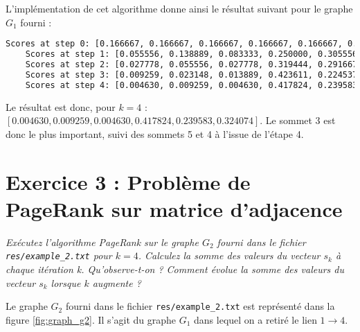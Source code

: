 L'implémentation de cet algorithme donne ainsi le résultat suivant pour le graphe $G_1$ fourni :

\begin{minipage}{\dimexpr\linewidth-20pt}
\begin{lstlisting}[language=bash, caption={Résultat de l'algorithme PageRank sur le graphe $G_1$ fourni, pour $k = 4$.}]
    Scores at step 0: [0.166667, 0.166667, 0.166667, 0.166667, 0.166667, 0.166667]
    Scores at step 1: [0.055556, 0.138889, 0.083333, 0.250000, 0.305556, 0.166667]
    Scores at step 2: [0.027778, 0.055556, 0.027778, 0.319444, 0.291667, 0.277778]
    Scores at step 3: [0.009259, 0.023148, 0.013889, 0.423611, 0.224537, 0.305556]
    Scores at step 4: [0.004630, 0.009259, 0.004630, 0.417824, 0.239583, 0.324074]
\end{lstlisting}
\end{minipage}

Le résultat est donc, pour $k = 4$ : $[0.004630, 0.009259, 0.004630, 0.417824, 0.239583, 0.324074]$. Le sommet 3 est donc le plus important, suivi des sommets 5 et 4 à l'issue de l'étape 4.

\section{Exercice 3 : Problème de PageRank sur matrice d'adjacence}

\textit{Exécutez l'algorithme PageRank sur le graphe $G_2$ fourni dans le fichier \texttt{res/example\_2.txt} pour $k = 4$. Calculez la somme des valeurs du vecteur $s_k$ à chaque itération k. Qu'observe-t-on ? Comment évolue la somme des valeurs du vecteur $s_k$ lorsque $k$ augmente ?}

Le graphe $G_2$ fourni dans le fichier \texttt{res/example\_2.txt} est représenté dans la figure \ref{fig:graph_g2}. Il s'agit du graphe $G_1$ dans lequel on a retiré le lien $1 \rightarrow 4$.

